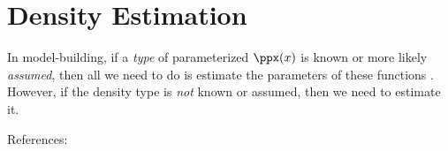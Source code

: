 \chapter{Density Estimation}
\label{chp:pdfest}
In model-building, if a \emph{type} of parameterized
  $\ppx(x)$ 
is known or more likely \emph{assumed}, 
then all we need to do is estimate the parameters of these functions .
However, if the density type is \emph{not} known or assumed, then we need to estimate it.

References:
\begin{liste}
  \item {}
\end{liste}

